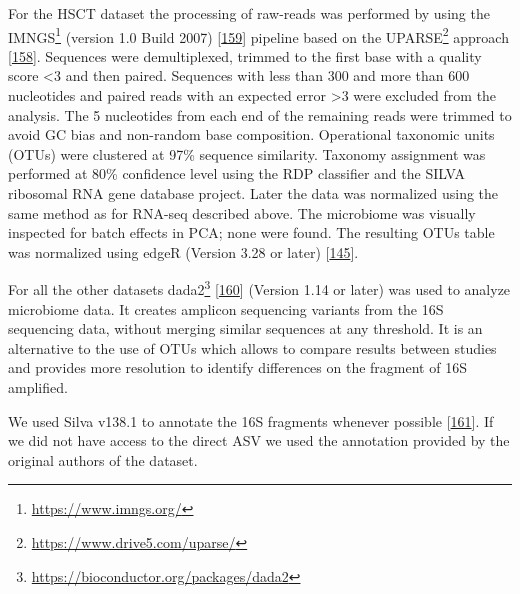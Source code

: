 \documentclass[
  12pt,
  a4paper,
  twoside,
  openright]{book}
\DeclareRobustCommand{\href}[2]{#2\footnote{\url{#1}}}
\begin{document}
For the HSCT dataset the processing of raw-reads was performed by using the \href{https://www.imngs.org/}{IMNGS} (version 1.0 Build 2007) {[}\protect\hyperlink{ref-lagkouvardos2016}{159}{]} pipeline based on the \href{https://www.drive5.com/uparse/}{UPARSE} approach {[}\protect\hyperlink{ref-edgar2013}{158}{]}.
Sequences were demultiplexed, trimmed to the first base with a quality score \textless3 and then paired.
Sequences with less than 300 and more than 600 nucleotides and paired reads with an expected error \textgreater3 were excluded from the analysis.
The 5 nucleotides from each end of the remaining reads were trimmed to avoid GC bias and non-random base composition.
Operational taxonomic units (OTUs) were clustered at 97\% sequence similarity.
Taxonomy assignment was performed at 80\% confidence level using the RDP classifier and the SILVA ribosomal RNA gene database project.
Later the data was normalized using the same method as for RNA-seq described above.
The microbiome was visually inspected for batch effects in PCA; none were found.
The resulting OTUs table was normalized using edgeR (Version 3.28 or later) {[}\protect\hyperlink{ref-mccarthy2012}{145}{]}.

For all the other datasets \href{https://bioconductor.org/packages/dada2}{dada2} {[}\protect\hyperlink{ref-callahan2016}{160}{]} (Version 1.14 or later) was used to analyze microbiome data.
It creates amplicon sequencing variants from the 16S sequencing data, without merging similar sequences at any threshold.
It is an alternative to the use of OTUs which allows to compare results between studies and provides more resolution to identify differences on the fragment of 16S amplified.

We used Silva v138.1 to annotate the 16S fragments whenever possible {[}\protect\hyperlink{ref-quast2013}{161}{]}.
If we did not have access to the direct ASV we used the annotation provided by the original authors of the dataset.
\end{document}

